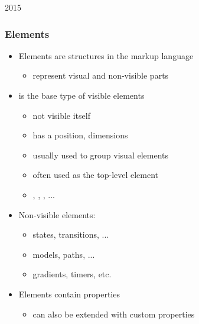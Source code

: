 \begin{slide}{2015}\frametitle{Elements}

\begin{itemize}
\item Elements are structures in the markup language
  \begin{itemize}
  \item represent visual and non-visible parts
  \end{itemize}
\item {} is the base type of visible elements
  \begin{itemize}
  \item not visible itself
  \item has a position, dimensions
  \item usually used to group visual elements
  \item often used as the top-level element
  \item {}, , , ...
  \end{itemize}
\item Non-visible elements:
  \begin{itemize}
  \item states, transitions, ...
  \item models, paths, ...
  \item gradients, timers, etc.
  \end{itemize}
\item Elements contain properties
  \begin{itemize}
  \item can also be extended with custom properties
  \end{itemize}
\end{itemize}



\end{slide}


